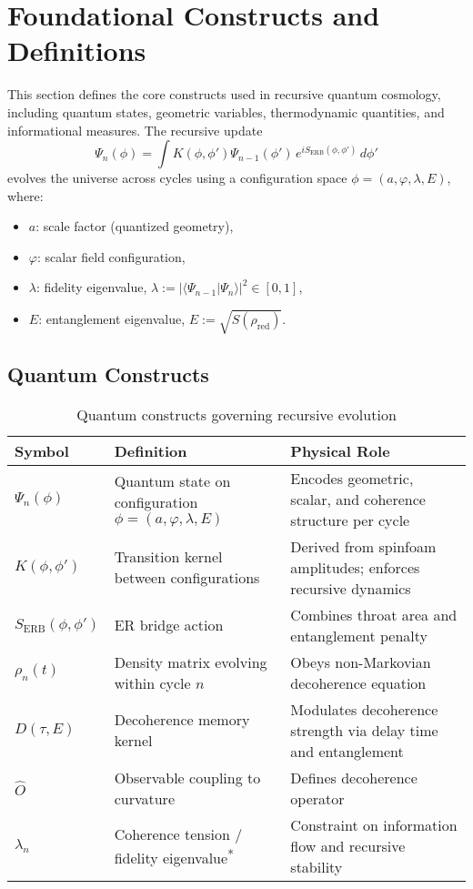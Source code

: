 \section{Foundational Constructs and Definitions}
\label{sec:foundations}

This section defines the core constructs used in recursive quantum cosmology, including quantum states, geometric variables, thermodynamic quantities, and informational measures. The recursive update
\[
\Psi_n(\phi) = \int K(\phi, \phi') \Psi_{n-1}(\phi') \, e^{i S_{\text{ERB}}(\phi, \phi')} \, d\phi'
\]
evolves the universe across cycles using a configuration space \( \phi = (a, \varphi, \lambda, E) \), where:
\begin{itemize}
    \item \( a \): scale factor (quantized geometry),
    \item \( \varphi \): scalar field configuration,
    \item \( \lambda \): fidelity eigenvalue, \( \lambda := |\langle \Psi_{n-1} | \Psi_n \rangle|^2 \in [0,1] \),
    \item \( E \): entanglement eigenvalue, \( E := \sqrt{S(\rho_{\text{red}})} \).
\end{itemize}

\subsection{Quantum Constructs}
\label{subsec:quantum-constructs}

\begin{table}[H]
\centering
\begin{tabular}{>{\raggedright}p{3cm}>{\raggedright}p{7cm}>{\raggedright\arraybackslash}p{5cm}}
\toprule
\textbf{Symbol} & \textbf{Definition} & \textbf{Physical Role} \\
\midrule
\( \Psi_n(\phi) \) & Quantum state on configuration \( \phi = (a, \varphi, \lambda, E) \) & Encodes geometric, scalar, and coherence structure per cycle \\
\addlinespace
\( K(\phi, \phi') \) & Transition kernel between configurations & Derived from spinfoam amplitudes; enforces recursive dynamics \\
\addlinespace
\( S_{\text{ERB}}(\phi, \phi') \) & ER bridge action & Combines throat area and entanglement penalty \\
\addlinespace
\( \rho_n(t) \) & Density matrix evolving within cycle \( n \) & Obeys non-Markovian decoherence equation \\
\addlinespace
\( D(\tau, E) \) & Decoherence memory kernel & Modulates decoherence strength via delay time and entanglement \\
\addlinespace
\( \hat{O} \) & Observable coupling to curvature & Defines decoherence operator \\
\addlinespace
\( \lambda_n \) & Coherence tension / fidelity eigenvalue\textsuperscript{*} & Constraint on information flow and recursive stability \\
\bottomrule
\end{tabular}
\caption{Quantum constructs governing recursive evolution}
\end{table}

